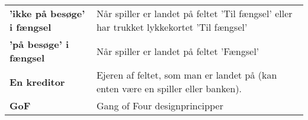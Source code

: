 \documentclass[class=article, crop=false]{standalone}
\begin{document}
    \begin{table}[H]
        \begin{tabularx}{\textwidth}{lX}

            \textbf{'ikke på besøge' i fængsel}& Når spiller er landet på feltet
                                            'Til fængsel' eller har trukket
                                             lykkekortet 'Til fængsel' \\
            \textbf{'på besøge' i fængsel}   & Når spiller er landet på feltet 'Fængsel'\\

            \textbf{En kreditor}   & Ejeren af feltet, som man er landet på (kan enten være en spiller eller banken).\\
            \textbf{GoF}   & Gang of Four designprincipper\\
        \end{tabularx}
    \end{table}
\end{document}
